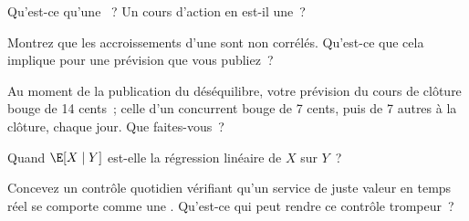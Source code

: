 \begin{interviewq}\label{iq:qm:probability-at-speed:2}
Qu'est-ce qu'une ~? Un cours d'action en est-il une~?
\end{interviewq}

\begin{interviewq}\label{iq:qm:probability-at-speed:3}
Montrez que les accroissements d'une  sont non corrélés. Qu'est-ce que cela
implique pour une prévision que vous publiez~?
\end{interviewq}

\begin{interviewq}\label{iq:qm:probability-at-speed:4}
Au moment de la publication du déséquilibre, votre prévision du cours de clôture bouge de 14 cents~; celle d'un concurrent
bouge de 7 cents, puis de 7 autres à la clôture, chaque jour. Que faites-vous~?
\end{interviewq}

\begin{interviewq}\label{iq:qm:probability-at-speed:5}
Quand $\E[X \mid Y]$ est-elle la régression linéaire de $X$ sur $Y$~?
\end{interviewq}

\begin{interviewq}\label{iq:qm:probability-at-speed:6}
Concevez un contrôle quotidien vérifiant qu'un service de juste valeur en temps réel se comporte comme une . Qu'est-ce qui peut
rendre ce contrôle trompeur~?
\end{interviewq}

